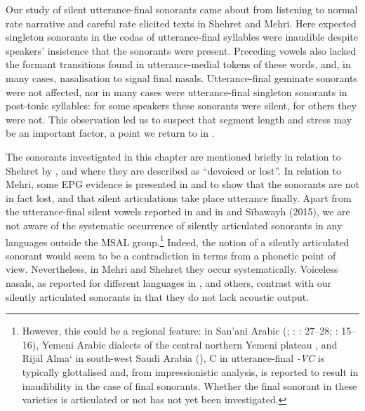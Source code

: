 \documentclass[output=paper]{langscibook}
\begin{document}
Our study of silent utterance-final sonorants came about from listening to normal rate narrative and careful rate elicited texts in Shehret and Mehri. Here expected singleton sonorants in the codas of utterance-final syllables were inaudible despite speakers’ insistence that the sonorants were present. Preceding vowels also lacked the formant transitions found in utterance-medial tokens of these words, and, in many cases, nasalisation to signal final nasals. Utterance-final geminate sonorants were not affected, nor in many cases were utterance-final singleton sonorants in post-tonic syllables: for some speakers these sonorants were silent, for others they were not. This observation led us to suspect that segment length and stress may be an important factor, a point we return to in .

The sonorants investigated in this chapter are mentioned briefly in relation to Shehret by \citet[xiv]{Johnstone1981}, \citet[24–25]{Dufour2016} and \citet[37–38]{Rubin2014} where they are described as ``devoiced or lost''.
In relation to Mehri, some EPG evidence is presented in \citet{WatsonHeselwood2016} and \citet{HeselwoodWatson2018} to show that the sonorants are not in fact lost, and that silent articulations take place utterance finally. Apart from the utterance-final silent vowels reported in \citet{GickEtAl2012} and in \citet{Jinni1993} and Sībawayh (2015), we are not aware of the systematic occurrence of silently articulated sonorants in any languages outside the MSAL group.\footnote{However, this could be a regional feature: in San’ani Arabic (\citealt{Jastrow1984}; \citealt{Naïm-Sanbar1994}: \citealt{Naïm2009}: 27–28; \citealt{WatsonHeselwood2016}: 15–16), Yemeni Arabic dialects of the central northern Yemeni plateau \citep[58]{Behnstedt1985}, and Rijāl Alma‘ in south-west Saudi Arabia (\citealt{WatsonAsiri2008}), C in utterance-final \textit{-\={V}C} is typically glottalised and, from impressionistic analysis, is reported to result in inaudibility in the case of final sonorants. Whether the final sonorant in these varieties is articulated or not has not yet been investigated.} Indeed, the notion of a silently articulated sonorant would seem to be a contradiction in terms from a phonetic point of view. Nevertheless, in Mehri and Shehret they occur systematically. Voiceless nasals, as reported for different languages in \citet{BhaskararaoLadefoged1991}, \citet{GogoiWayland2018} and others, contrast with our silently articulated sonorants in that they do not lack acoustic output.
\end{document}
